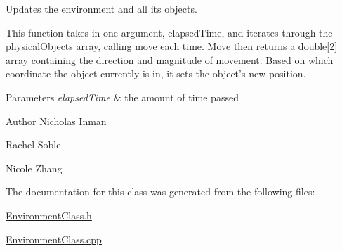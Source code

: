 Updates the environment and all its objects. 

This function takes in one argument, elapsed\-Time, and iterates through the physical\-Objects array, calling move each time. Move then returns a double\mbox{[}2\mbox{]} array containing the direction and magnitude of movement. Based on which coordinate the object currently is in, it sets the object's new position.


\begin{DoxyParams}{Parameters}
{\em elapsed\-Time} & the amount of time passed\\
\hline
\end{DoxyParams}
\begin{DoxyAuthor}{Author}
Nicholas Inman 

Rachel Soble 

Nicole Zhang 
\end{DoxyAuthor}


The documentation for this class was generated from the following files\-:\begin{DoxyCompactItemize}
\item 
\hyperlink{EnvironmentClass_8h}{Environment\-Class.\-h}\item 
\hyperlink{EnvironmentClass_8cpp}{Environment\-Class.\-cpp}\end{DoxyCompactItemize}
